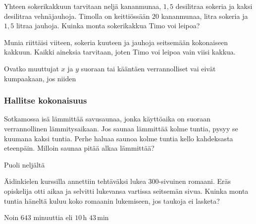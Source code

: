 \begin{tehtavasivu}
\begin{tehtava}
Yhteen sokerikakkuun tarvitaan neljä kananmunaa, $1,5$ desilitraa sokeria ja kaksi desilitraa vehnäjauhoja. Timolla on keittiössään $20$ kananmunaa, litra sokeria ja $1,5$ litraa jauhoja. Kuinka monta sokerikakkua Timo voi leipoa?  
\begin{vastaus}
Munia riittäisi viiteen, sokeria kuuteen ja jauhoja seitsemään kokonaiseen kakkuun. Kaikki aineksia tarvitaan, joten Timo voi leipoa vain viisi kakkua.
\end{vastaus}
\end{tehtava}

\begin{tehtava}
Ovatko muuttujat $ x $ ja $ y $ suoraan tai kääntäen verrannolliset vai eivät kumpaakaan, jos niiden
\begin{vastaus}
\end{vastaus}
\end{tehtava}

\subsubsection*{Hallitse kokonaisuus}


\begin{tehtava}
Sotkamossa isä lämmittää savusaunaa, jonka käyttöaika on suoraan verrannollinen lämmitysaikaan. Jos saunaa lämmittää kolme tuntia, pysyy se kuumana kaksi tuntia. Perhe haluaa saunoa kolme tuntia kello kahdeksasta eteenpäin. Milloin saunaa pitää alkaa lämmittää?
\begin{vastaus}
Puoli neljältä
\end{vastaus}
\end{tehtava}

\begin{tehtava}
Äidinkielen kurssilla annettiin tehtäväksi lukea $300$-sivuinen romaani. Eräs opiskelija otti aikaa ja selvitti lukevansa vartissa seitsemän sivua. Kuinka monta tuntia häneltä kuluu koko romaanin lukemiseen, jos taukoja ei lasketa?
    
    \begin{vastaus}
        Noin $643$ minuuttia eli $10$\,h $43$\,min
    \end{vastaus}
\end{tehtava}


\end{tehtavasivu}
